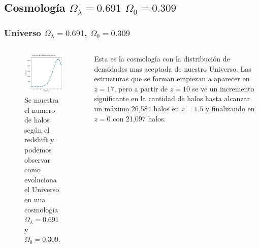 \documentclass{beamer}
\begin{document}
\subsection{Cosmología \texorpdfstring{$\Omega_\lambda = 0.691$ $\Omega_0 = 0.309$ }{Omega lambda = 0.691, Omega 0 = 0.309} }
	\begin{frame}
		\frametitle{Universo $\Omega_\lambda=0.691$, $\Omega_0=0.309$}
		\begin{columns}[t]
           	\begin{column}{.5\textwidth}

				\begin{figure}
					\centering
					\includegraphics[scale=0.38]{RunCanonica/TotalHalos_RunCanonica.png}
					\caption{\footnotesize Se muestra el numero de halos según el redshift y podemos observar como evoluciona el Universo en una cosmología $\Omega_\lambda = 0.691 $ y $\Omega_0 = 0.309$.}
					\label{fig:TotalHalos_CanonRun}
				\end{figure}

	        \end{column}
			\vspace{0.5cm}
    	    \begin{column}{.5\textwidth}

    	    	Esta es la cosmología con la distribución de densidades mas aceptada de nuestro Universo. Las estructuras que se forman empiezan a aparecer en $z=17$, pero a partir de $z=10$ se ve un incremento significante en la cantidad de halos hasta alcanzar un máximo 26,584 halos en $z = 1.5$ y finalizando en $z=0$ con 21,097 halos.

        	\end{column}
	    \end{columns}

	\end{frame}
\end{document}
